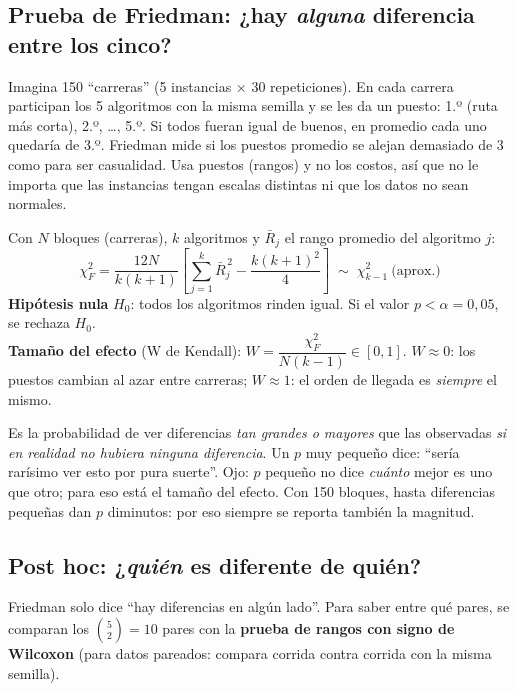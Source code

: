\documentclass[11pt,a4paper]{article}
\begin{document}
\subsection{Prueba de Friedman: ¿hay \emph{alguna} diferencia entre los cinco?}
\begin{idea}
Imagina 150 ``carreras'' (5 instancias $\times$ 30 repeticiones). En cada carrera participan los 5 algoritmos con la misma semilla y se les da
un puesto: 1.º (ruta más corta), 2.º, \dots, 5.º. Si todos fueran igual de buenos, en promedio cada uno quedaría de 3.º.
Friedman mide si los puestos promedio se alejan demasiado de 3 como para ser casualidad.
Usa puestos (rangos) y no los costos, así que no le importa que las instancias tengan escalas distintas ni que los datos no sean normales.
\end{idea}
\begin{mate}
Con $N$ bloques (carreras), $k$ algoritmos y $\bar R_j$ el rango promedio del algoritmo $j$:
\[
\chi^2_F=\frac{12N}{k(k+1)}\left[\sum_{j=1}^{k}\bar R_j^{\,2}-\frac{k(k+1)^2}{4}\right]\;\sim\;\chi^2_{k-1}\ \text{(aprox.)}
\]
\textbf{Hipótesis nula} $H_0$: todos los algoritmos rinden igual. Si el valor $p<\alpha=0{,}05$, se rechaza $H_0$.\\
\textbf{Tamaño del efecto} (W de Kendall): $W=\dfrac{\chi^2_F}{N(k-1)}\in[0,1]$. $W\approx0$: los puestos cambian al azar entre carreras;
$W\approx1$: el orden de llegada es \emph{siempre} el mismo.
\end{mate}
\begin{porque}
Es la probabilidad de ver diferencias \emph{tan grandes o mayores} que las observadas \emph{si en realidad no hubiera ninguna diferencia}.
Un $p$ muy pequeño dice: ``sería rarísimo ver esto por pura suerte''. Ojo: $p$ pequeño no dice \emph{cuánto} mejor es uno que otro; para eso está el
tamaño del efecto. Con 150 bloques, hasta diferencias pequeñas dan $p$ diminutos: por eso siempre se reporta también la magnitud.
\end{porque}

\subsection{Post hoc: ¿\emph{quién} es diferente de quién?}
Friedman solo dice ``hay diferencias en algún lado''. Para saber entre qué pares, se comparan los $\binom{5}{2}=10$ pares con la
\textbf{prueba de rangos con signo de Wilcoxon} (para datos pareados: compara corrida contra corrida con la misma semilla).
\end{document}
